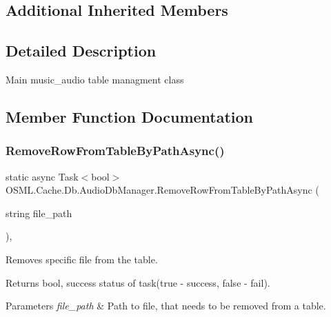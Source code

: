 \subsection*{Additional Inherited Members}


\subsection{Detailed Description}
Main music\+\_\+audio table managment class 



\subsection{Member Function Documentation}
\mbox{\label{classOSML_1_1Cache_1_1Db_1_1AudioDbManager_a55cf000916b79947d45c83760f46acb1}} 
\subsubsection{\texorpdfstring{RemoveRowFromTableByPathAsync()}{RemoveRowFromTableByPathAsync()}}
{\footnotesize\ttfamily static async Task$<$bool$>$ O\+S\+M\+L.\+Cache.\+Db.\+Audio\+Db\+Manager.\+Remove\+Row\+From\+Table\+By\+Path\+Async (\begin{DoxyParamCaption}\item[{string}]{file\+\_\+path }\end{DoxyParamCaption})\hspace{0.3cm}{\ttfamily [inline]}, {\ttfamily [static]}}



Removes specific file from the table. 

\begin{DoxyReturn}{Returns}
bool, success status of task(true -\/ success, false -\/ fail). 
\end{DoxyReturn}

\begin{DoxyParams}{Parameters}
{\em file\+\_\+path} & Path to file, that needs to be removed from a table.\\
\hline
\end{DoxyParams}
\mbox{\label{classOSML_1_1Cache_1_1Db_1_1AudioDbManager_aa236815a7d2ae17f4e8e4886b1a85497}} 
